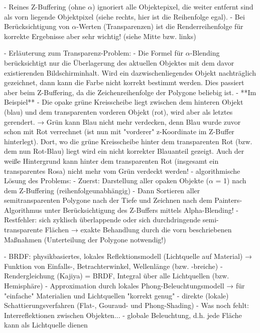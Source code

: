\documentclass[10pt,landscape]{article}
\makeatletter
\renewcommand{\section}{\@startsection{section}{1}{0mm}%
                                {-1ex plus -.5ex minus -.2ex}%
                                {0.5ex plus .2ex}%
                                {\normalfont\large\bfseries}}
\makeatother
\begin{document}
\begin{multicols}{3}

- Reines Z-Buffering (ohne $\alpha$) ignoriert alle Objektepixel, die weiter entfernt sind als vorn liegende Objektpixel (siehe rechts, hier ist die Reihenfolge egal).
- Bei Berücksichtigung von $\alpha$-Werten (Transparenzen) ist die Renderreihenfolge für korrekte Ergebnisse aber sehr wichtig! (siehe Mitte bzw. links)

- Erläuterung zum Transparenz-Problem: 
  - Die Formel für $\alpha$-Blending berücksichtigt nur die Überlagerung des aktuellen Objektes mit dem davor existierenden Bildschirminhalt. Wird ein dazwischenliegendes Objekt nachträglich gezeichnet, dann kann die Farbe nicht korrekt bestimmt werden. Dies passiert aber beim Z-Buffering, da die Zeichenreihenfolge der Polygone beliebig ist. 
- **Im Beispiel**
  - Die opake grüne Kreisscheibe liegt zwischen dem hinteren Objekt (blau) und dem transparenten vorderen Objekt (rot), wird aber als letztes gerendert. → Grün kann Blau nicht mehr verdecken, denn Blau wurde zuvor schon mit Rot verrechnet (ist nun mit "vorderer" z-Koordinate im Z-Buffer hinterlegt). Dort, wo die grüne Kreisscheibe hinter dem transparenten Rot (bzw. dem nun Rot-Blau) liegt wird ein nicht korrekter Blauanteil gezeigt. Auch der weiße Hintergrund kann hinter dem transparenten Rot (insgesamt ein transparentes Rosa) nicht mehr vom Grün verdeckt werden!
- algorithmische Lösung des Problems: 
  - Zuerst: Darstellung aller opaken Objekte ($\alpha$ = 1) nach dem Z-Buffering (reihenfolgeunabhängig)
  - Dann Sortieren aller semitransparenten Polygone nach der Tiefe und Zeichnen nach dem Painters-Algorithmus unter Berücksichtigung des Z-Buffers mittels Alpha-Blending!
  - Restfehler: sich zyklisch überlappende oder sich durchdringende semi-transparente Flächen → exakte Behandlung durch die vorn beschriebenen Maßnahmen (Unterteilung der Polygone notwendig!)

- BRDF: physikbasiertes, lokales Reflektionsmodell (Lichtquelle auf Material) → Funktion von Einfalls-, Betrachterwinkel, Wellenlänge (bzw. -breiche)
- Rendergleichung (Kajiya) = BRDF, Integral über alle Lichtquellen (bzw. Hemisphäre)
- Approximation durch lokales Phong-Beleuchtungsmodell → für "einfache" Materialien und Lichtquellen "korrekt genug"
- direkte (lokale) Schattierungsverfahren (Flat-, Gouraud- und Phong-Shading)
- Was noch fehlt: Interreflektionen zwischen Objekten...
  - globale Beleuchtung, d.h. jede Fläche kann als Lichtquelle dienen


\end{multicols}
\end{document}
